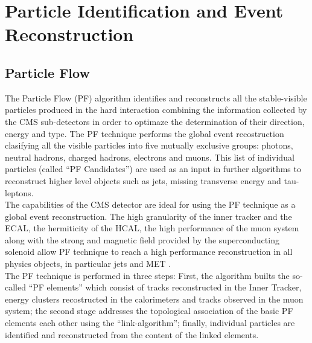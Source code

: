 \chapter[Particle Identification and Event Reconstruction]{Particle Identification and Event Reconstruction}
\label{chap:ParticleID}




\section{Particle Flow}
\label{sec:PF}

The Particle Flow (PF) algorithm \cite{CMS-PAS-PFT-09-001} identifies and reconstructs all the stable-visible particles produced in the hard interaction
combining the information collected by the CMS sub-detectors in order to optimaze the determination of their direction, energy and type. The PF 
technique performs the global event recostruction clasifying all the visible particles into five mutually exclusive groups: photons, 
neutral hadrons, charged hadrons, electrons and muons. This list of individual particles (called ``PF Candidates'') are used 
as an input in further algorithms to reconstruct higher level objects such as jets, missing transverse energy and tau-leptons. \\

The capabilities of the CMS detector are ideal for using the PF technique as a global event reconstruction. The high 
granularity of the inner tracker and the ECAL, the hermiticity of the HCAL, the high performance of the muon system 
along with the strong and magnetic field provided by the superconducting solenoid allow PF technique to reach a 
high performance reconstruction in all physics objects, in particular jets and MET \cite{CMS-PAS-PFT-10-001}.\\


The PF technique is performed in three steps: First, the algorithm builts the so-called ``PF elements'' which consist of tracks 
reconstructed in the Inner Tracker, energy clusters recostructed in the calorimeters and tracks observed in the muon system;
the second stage addresses the topological association of the basic PF elements each other using the ``link-algorithm''; finally,
individual particles are identified and reconstructed from the content of the linked elements. \\


